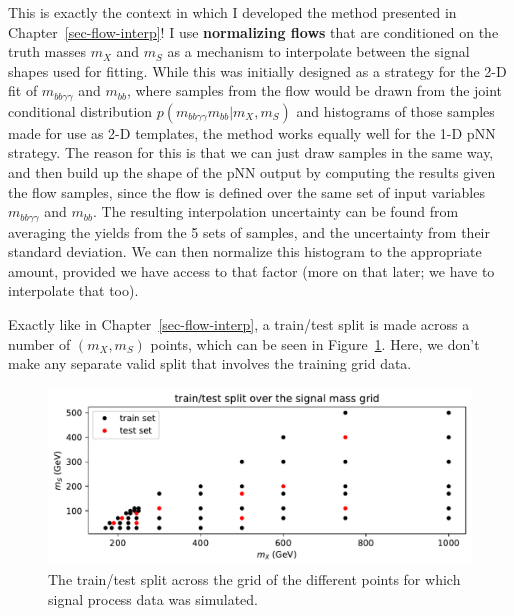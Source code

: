 \documentclass[
  11pt,
  numbers=noendperiod]{book}
\begin{document}
This is exactly the context in which I developed the method presented in
Chapter~\ref{sec-flow-interp}! I use \textbf{normalizing flows} that are
conditioned on the truth masses \(m_X\) and \(m_S\) as a mechanism to
interpolate between the signal shapes used for fitting. While this was
initially designed as a strategy for the 2-D fit of
\(m_{bb\gamma\gamma}\) and \(m_{bb}\), where samples from the flow would
be drawn from the joint conditional distribution
\(p(m_{bb\gamma\gamma} m_{bb} | m_X, m_S)\) and histograms of those
samples made for use as 2-D templates, the method works equally well for
the 1-D pNN strategy. The reason for this is that we can just draw
samples in the same way, and then build up the shape of the pNN output
by computing the results given the flow samples, since the flow is
defined over the same set of input variables \(m_{bb\gamma\gamma}\) and
\(m_{bb}\). The resulting interpolation uncertainty can be found from
averaging the yields from the 5 sets of samples, and the uncertainty
from their standard deviation. We can then normalize this histogram to
the appropriate amount, provided we have access to that factor (more on
that later; we have to interpolate that too).

Exactly like in Chapter~\ref{sec-flow-interp}, a train/test split is
made across a number of \((m_X, m_S)\) points, which can be seen in
Figure~\ref{fig-train-test-sh}. Here, we don't make any separate valid
split that involves the training grid data.

\begin{figure}

{\centering \includegraphics{./images/sh/flow-mass-grid.pdf}

}

\caption{\label{fig-train-test-sh}The train/test split across the grid
of the different points for which signal process data was simulated.}

\end{figure}
\end{document}
